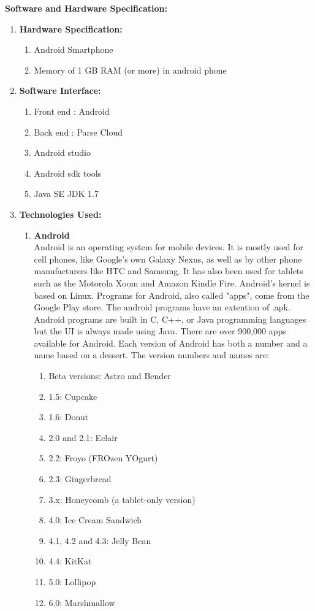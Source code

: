 \item\textbf{Software and Hardware Speciﬁcation:}
\begin{enumerate}
\item \textbf{Hardware Speciﬁcation:}
\begin{enumerate}
\item Android Smartphone
\item Memory of 1 GB RAM (or more) in android phone
\end{enumerate}
\item \textbf{Software Interface:}
\begin{enumerate}
\item Front end : Android
\item Back end : Parse Cloud
\item Android studio
\item Android sdk tools
\item Java SE JDK 1.7
\end{enumerate}
\item\textbf{Technologies Used:}\\
\begin{enumerate}
\item\textbf{Android}\\
   Android is an operating system for mobile devices. It is mostly used for cell phones, like Google's own Galaxy Nexus, as well as by other phone manufacturers like HTC and Samsung. It has also been used for tablets such as the Motorola Xoom and Amazon Kindle Fire. Android's kernel is based on Linux. Programs for Android, also called "apps", come from the Google Play store. The android programs have an extention of .apk. Android programs are built in C, C++, or Java programming languages but the UI is always made using Java. There are over 900,000 apps available for Android. Each version of Android has both a number and a name based on a dessert. The version numbers and names are:
   \begin{enumerate}
      
    \item Beta versions: Astro and Bender
    \item 1.5: Cupcake
    \item 1.6: Donut
    \item 2.0 and 2.1: Eclair
    \item 2.2: Froyo (FROzen YOgurt)
    \item 2.3: Gingerbread
    \item 3.x: Honeycomb (a tablet-only version)
    \item 4.0: Ice Cream Sandwich
    \item 4.1, 4.2 and 4.3: Jelly Bean
    \item 4.4: KitKat
    \item 5.0: Lollipop
    \item 6.0: Marshmallow
    

\end{enumerate}
\end{enumerate}
\end{enumerate}
